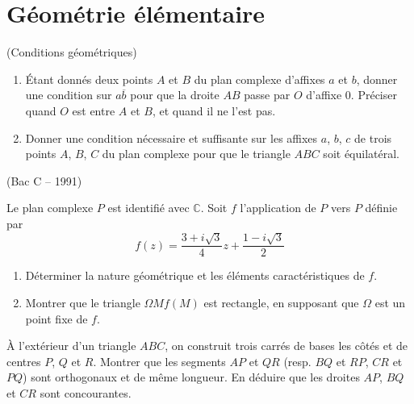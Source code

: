 \documentclass[a4paper,12pt,reqno]{amsart}
\begin{document}

\section{Géométrie élémentaire}


\begin{exo} (Conditions géométriques)
  \begin{enumerate}
    \item Étant donnés deux points $A$ et $B$ du plan complexe d'affixes $a$ et $b$, donner une condition sur $a\overline{b}$ pour que la droite $AB$ passe par $O$ d'affixe $0$. Préciser quand $O$ est entre $A$ et $B$, et quand il ne l'est pas.

    \item Donner une condition nécessaire et suffisante sur les affixes $a$, $b$, $c$ de trois points $A$, $B$, $C$ du plan complexe pour que le triangle $ABC$ soit équilatéral.
  \end{enumerate}
\end{exo}


\begin{exo} (Bac C -- 1991)

  Le plan complexe $P$ est identifié avec $\mathbb{C}$. Soit $f$ l'application de $P$ vers $P$ définie par
    $$
      f(z)=\frac{3+i\sqrt{3}}{4}z+\frac{1-i\sqrt{3}}{2}
    $$
  \begin{enumerate}
    \item Déterminer la nature géométrique et les éléments caractéristiques de $f$.
    \item Montrer que le triangle $\Omega M\! f(M)$ est rectangle, en supposant que $\Omega$ est un point fixe de $f$.
  \end{enumerate}
\end{exo}


\begin{exo}


  À l'extérieur d'un triangle $ABC$, on construit trois carrés de bases les côtés et de centres $P$, $Q$ et $R$. Montrer que les segments $AP$ et $QR$ (resp. $BQ$ et $RP$, $CR$ et $PQ$) sont orthogonaux et de même longueur. En déduire que les droites $AP$, $BQ$ et $CR$ sont concourantes.
\end{exo}
\vspace{3mm}
\end{document}
